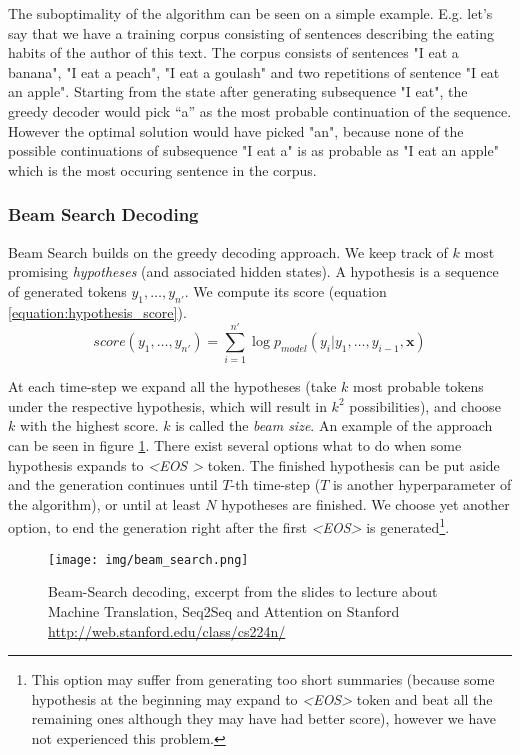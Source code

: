 The suboptimality of the algorithm can be seen on a simple example. E.g. let's say that we have a training corpus consisting of sentences describing the eating habits of the author of this text. The corpus consists of sentences "I eat a banana", "I eat a peach", "I eat a goulash" and two repetitions of sentence "I eat an apple". Starting from the state after generating subsequence "I eat", the greedy decoder would pick ``a'' as the most probable continuation of the sequence. However the optimal solution would have picked "an", because none of the possible continuations of subsequence "I eat a" is as probable as "I eat an apple" which is the most occuring sentence in the corpus.

\subsubsection{Beam Search Decoding}

Beam Search builds on the greedy decoding approach. We keep track of $k$ most promising \emph{hypotheses} (and associated hidden states). A hypothesis is a sequence of generated tokens $y_1,\dots,y_{n'}$. We compute its score (equation \ref{equation:hypothesis_score}).
\begin{equation} \label{equation:hypothesis_score}
    score(y_1,\dots,y_{n'}) = \sum_{i=1}^{n'}{\log{p_{model}(y_i | y_1, \dots, y_{i-1}, \boldsymbol{x})}}
\end{equation}

At each time-step we expand all the hypotheses (take $k$ most probable tokens under the respective hypothesis, which will result in $k^2$ possibilities), and choose $k$ with the highest score. $k$ is called the \emph{beam size}. An example of the approach can be seen in figure \ref{figure:beam_search}. There exist several options what to do when some hypothesis expands to \emph{\textless EOS \textgreater} token. The finished hypothesis can be put aside and the generation continues until $T$-th time-step ($T$ is another hyperparameter of the algorithm), or until at least $N$ hypotheses are finished. We choose yet another option, to end the generation right after the first \emph{\textless EOS\textgreater} is generated\footnote{This option may suffer from generating too short summaries (because some hypothesis at the beginning may expand to \emph{\textless EOS\textgreater} token and beat all the remaining ones although they may have had better score), however we have not experienced this problem.}.

\begin{figure}[!h]
    \centering
    \texttt{[image: img/beam\_search.png]}
    \caption{\centering Beam-Search decoding, excerpt from the slides to lecture about Machine Translation, Seq2Seq and Attention on Stanford \url{http://web.stanford.edu/class/cs224n/}} \label{figure:beam_search}
\end{figure}


